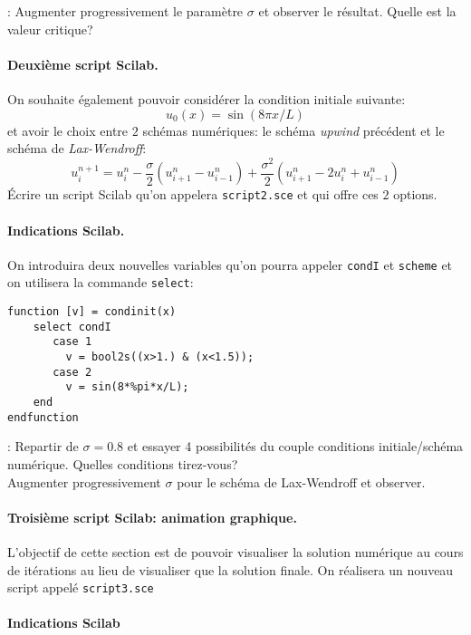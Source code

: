 \documentclass[12pt,a4paper]{article}
\begin{document}
: Augmenter progressivement le param\`etre $\sigma$ et
observer le r\'esultat. Quelle est la valeur critique?
\newpage
\paragraph{Deuxi\`eme script Scilab.} On souhaite \'egalement pouvoir consid\'erer la condition initiale suivante:
$$
u_0(x) = \sin(8\pi x/L)
$$ 
et avoir le choix entre $2$ sch\'emas num\'eriques: le sch\'ema
{\it upwind} pr\'ec\'edent et le sch\'ema de {\it Lax-Wendroff}:
$$
u_i^{n+1}=u_i^n-\frac{\sigma}{2}(u_{i+1}^n-u_{i-1}^n)+\frac{\sigma^2}{2}(u_{i+1}^n-2u_i^n+u_{i-1}^n)
$$
\'Ecrire un script Scilab qu'on appelera \texttt{script2.sce} et qui offre ces $2$ options.

\paragraph{Indications Scilab.} On introduira deux nouvelles variables qu'on pourra appeler
\texttt{condI} et \texttt{scheme} et on utilisera la commande
\texttt{select}:
\begin{verbatim}
function [v] = condinit(x)
    select condI
       case 1
         v = bool2s((x>1.) & (x<1.5));
       case 2
         v = sin(8*%pi*x/L);
    end
endfunction
\end{verbatim}
: Repartir de $\sigma=0.8$ et essayer 4 possibilit\'es
du couple conditions initiale/sch\'ema num\'erique. Quelles conditions
tirez-vous?\\ 
Augmenter progressivement $\sigma$ pour le sch\'ema de
Lax-Wendroff et observer.

\paragraph{Troisi\`eme script Scilab: animation graphique.} L'objectif
de cette section est de pouvoir visualiser la solution num\'erique au cours de it\'erations au lieu de visualiser que la
solution finale. On r\'ealisera un nouveau script appel\'e
\texttt{script3.sce}

\paragraph{Indications Scilab}
\end{document}
